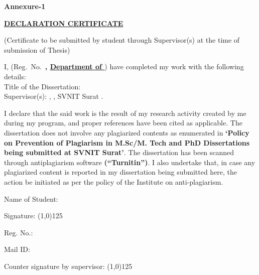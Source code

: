 \begin{flushright}
    \textbf{Annexure-1}
\end{flushright}

\vspace{15pt}

\begin{center}
    {\Large \textbf{\uline{{DECLARATION CERTIFICATE}}}}
\end{center}

\vspace{15pt}

\begin{spacing}{1.5}
(Certificate to be submitted by \DegreeShort{} student through Supervisor(s) at the time of submission of Thesis)

I, \textbf{\uline{\Author}} \hspace{2pt}(Reg.\ No.\ \textbf{\uline{\MakeUppercase\Rollno}, \uline{Department of \Subject}}) have completed my \DegreeShort{} work with the following details: \\ 
Title of the Dissertation: \textbf{\expandafter\uline\expandafter{\Title}} \\
Supervisor(s): \InternalSupervisor, \InternalSupervisorDept, SVNIT Surat \ifdef{\ExternalSupervisor}{\& \ExternalSupervisor, \ExternalSupervisorPosition, \ExternalSupervisorDept, \ExternalSupervisorInsti, \ExternalSupervisorInstiCity}{}.

I declare that the said work is the result of my research activity created by me during my \DegreeShort{} program, and proper references have been cited as applicable. The dissertation does not involve any plagiarized contents as enumerated in \textbf{‘Policy on Prevention of Plagiarism in M.Sc/M. Tech and PhD Dissertations being submitted at  SVNIT  Surat’}.  The dissertation has been scanned through antiplagiarism software \textbf{(“Turnitin”)}. I also undertake that, in case any plagiarized content is reported in my dissertation being submitted here, the action be initiated as per the policy of the Institute on anti-plagiarism.

\end{spacing}

\vspace{75pt}

\begin{multicols}{2}
    Name of Student: \Author
    
    \columnbreak

    \begin{center}
        Signature: \line(1,0){125}
    \end{center}

\end{multicols}

\begin{multicols}{2}
    Reg. No.: \MakeUppercase{\Rollno}    
    
    \columnbreak

    \begin{center}
        Mail ID: \Email
    \end{center}

\end{multicols}

\vspace{75pt}

Counter signature by supervisor: \line(1,0){125}